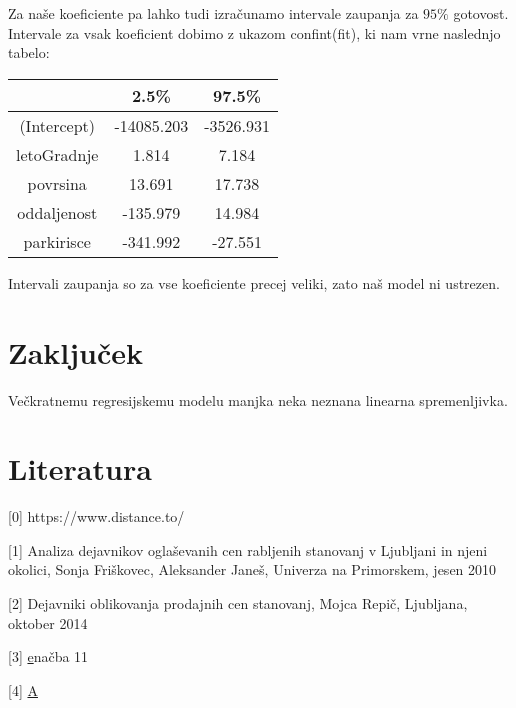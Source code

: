 \documentclass[a4paper, 12pt]{article}
\begin{document}
Za naše koeficiente pa lahko tudi izračunamo intervale zaupanja za $ 95\% $
gotovost. Intervale za vsak koeficient dobimo z ukazom {\sf confint(fit)}, ki
nam vrne naslednjo tabelo:
\begin{center}
\begin{tabular}{ c|cc }
	& 2.5\% & 97.5\% \\
	\hline
	(Intercept) & -14085.203 & -3526.931 \\
	letoGradnje & 1.814 & 7.184 \\
	povrsina & 13.691 & 17.738 \\
	oddaljenost & -135.979 & 14.984 \\
	parkirisce & -341.992 & -27.551 \\
\end{tabular}
\end{center}
Intervali zaupanja so za vse koeficiente precej veliki, zato naš model ni
ustrezen.

\section{Zaključek}

Večkratnemu regresijskemu modelu manjka neka neznana linearna spremenljivka.

\section{Literatura}

[0]
https://www.distance.to/

[1] Analiza dejavnikov oglaševanih cen rabljenih stanovanj v Ljubljani in njeni
okolici, Sonja Friškovec, Aleksander Janeš, Univerza na Primorskem, jesen 2010

[2] Dejavniki oblikovanja prodajnih cen stanovanj, Mojca Repič, Ljubljana,
oktober 2014

[3] \href{https://www.researchgate.net/publication/239329925_A_New_Test_of_Symmetry_about_an_Unknown_Median}
enačba 11

[4] \href{https://gitlab.com/ul-fri/ovs/projekt/-/blob/master/regresija.pdf}{A}
\end{document}
